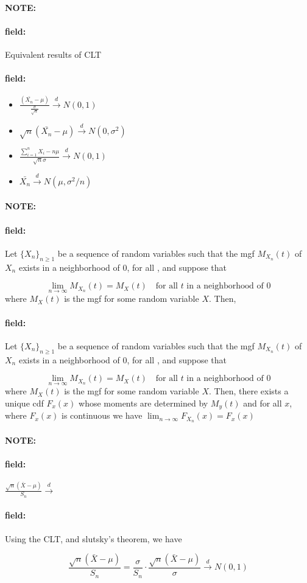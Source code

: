 \documentclass[12pt]{article}
\newenvironment{note}{\paragraph{NOTE:}}{}
\newenvironment{field}{\paragraph{field:}}{}
\begin{document}
\begin{note}
  \begin{field}
    Equivalent results of CLT
  \end{field}
  \begin{field}
    \begin{itemize}
      \item $\frac{(\bar{X_n} - \mu)}{\frac{\sigma}{\sqrt{n}}} \overset{d}{\to}N(0,1)$
      \item $\sqrt{n}(\bar{X_n} - \mu) \overset{d}{\to} N(0,\sigma^2)$
      \item $\frac{\sum_{i=1}^n X_i - n\mu}{\sqrt{n}\sigma} \overset{d}{\to}N(0,1)$
      \item $\bar{X_n} \overset{d}{\to} N(\mu, \sigma^2/n)$
    \end{itemize}
  \end{field}
\end{note}


\begin{note}
  \begin{field}
    Let $\{X_n\}_{n \geq 1}$ be a sequence of random variables such that the mgf $M_{X_n}(t)$ of $X_n$ exists in a neighborhood of 0, for all , and suppose that

    $$ \lim_{n \to \infty} M_{X_n}(t) = M_X(t) \quad \text{for all } t \text{ in a neighborhood of }0$$
    where $M_X(t)$ is the mgf for some random variable $X$. Then,
  \end{field}
  \begin{field}
    Let $\{X_n\}_{n \geq 1}$ be a sequence of random variables such that the mgf $M_{X_n}(t)$ of $X_n$ exists in a neighborhood of 0, for all , and suppose that

    $$ \lim_{n \to \infty} M_{X_n}(t) = M_X(t) \quad \text{for all } t \text{ in a neighborhood of }0$$
    where $M_X(t)$ is the mgf for some random variable $X$. Then, there exists a unique cdf $F_x(x)$ whose moments are determined by $M_y(t)$ and for all $x$, where $F_x(x)$ is continuous we have $\lim_{n \to \infty} F_{X_n}(x) = F_x(x)$
  \end{field}
\end{note}

\begin{note}
  \begin{field}
    $\frac{\sqrt{n}(\bar{X} - \mu)}{S_n} \overset{d}{\to} $
  \end{field}
  \begin{field}
    Using the CLT, and slutsky's theorem, we have

    $$\frac{\sqrt{n}(\bar{X} - \mu)}{S_n} = \frac{\sigma}{S_n}\cdot \frac{\sqrt{n}(\bar{X} - \mu)}{\sigma} \overset{d}{\to} N(0,1) $$
  \end{field}
\end{note}
\end{document}
